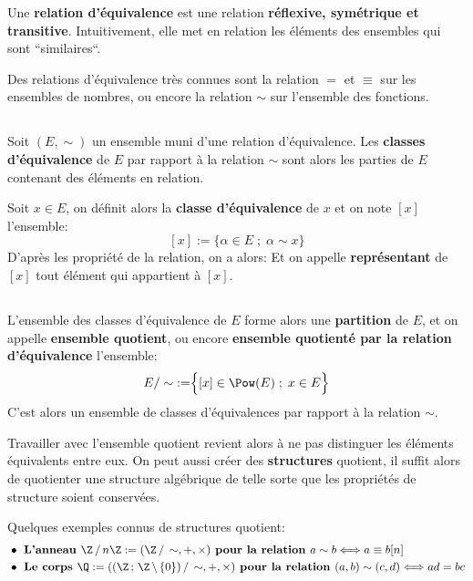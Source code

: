 Une \textbf{relation d'équivalence} est une relation \textbf{réflexive, symétrique et transitive}. Intuitivement, elle met en relation les éléments des ensembles qui sont ``similaires``.\<

Des relations d'équivalence très connues sont la relation \(=\) et \(\equiv\) sur les ensembles de nombres, ou encore la relation \(\sim\) sur l'ensemble des fonctions.

\subsection*{}

Soit \((E, \sim)\) un ensemble muni d'une relation d'équivalence.\+
Les \textbf{classes d'équivalence} de \(E\) par rapport à la relation \(\sim\) sont alors les parties de \(E\) contenant des éléments en relation.\<

Soit \(x \in E\), on définit alors la \textbf{classe d'équivalence} de \(x\) et on note \([x]\) l'ensemble:
\[
    [x] := \Bigr\{ \alpha \in E \; ; \; \alpha \sim x \Bigr\}
\]
D'après les propriété de la relation, on a alors:
Et on appelle \textbf{représentant} de \([x]\) tout élément qui appartient à \([x]\).

\subsection*{}

L'ensemble des classes d'équivalence de \(E\) forme alors une \textbf{partition} de \(E\), et on appelle \textbf{ensemble quotient}, ou encore \textbf{ensemble quotienté par la relation d'équivalence} l'ensemble:
\[
    E / \sim \; := \Bigr\{ [x] \in \Pow(E) \; ; \; x \in E \Bigr\}
\]
C'est alors un ensemble de classes d'équivalences par rapport à la relation \(\sim\).\<

Travailler avec l'ensemble quotient revient alors à ne pas distinguer les éléments équivalents entre eux.\+
On peut aussi créer des \textbf{structures} quotient, il suffit alors de quotienter une structure algébrique de telle sorte que les propriétés de structure soient conservées.\<

Quelques exemples connus de structures quotient:
\begin{align*}
    &\bullet \textbf{ L'anneau } \Z \,/\, n\Z := (\Z \,/\, \sim, +, \times) \textbf{ pour la relation } a \sim b \Longleftrightarrow a \equiv b [n] \\
    &\bullet \textbf{ Le corps } \Q := ((\Z \, ; \, \Z \, \backslash \, \{0\}) \, / \, \sim, +, \times) \textbf{ pour la relation } (a, b) \sim (c, d) \Longleftrightarrow ad = bc
\end{align*}
